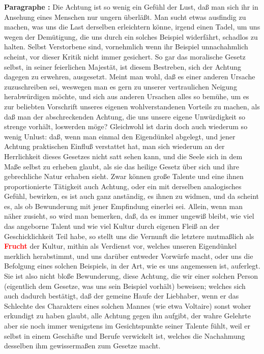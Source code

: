 \documentclass[a4paper,12pt,twoside]{book}
\newcommand{\match}[1]{\textcolor{red}{\textbf{#1}}}
\begin{document}
	\textbf{Paragraphe : }Die Achtung ist so wenig ein Gefühl der Lust, daß man sich ihr in Ansehung eines Menschen nur ungern überläßt. Man sucht etwas ausfindig zu machen, was uns die Last derselben erleichtern könne, irgend einen Tadel, um uns wegen der Demütigung, die uns durch ein solches Beispiel widerfährt, schadlos zu halten. Selbst Verstorbene sind, vornehmlich wenn ihr Beispiel unnachahmlich scheint, vor dieser Kritik nicht immer gesichert. So gar das moralische Gesetz selbst, in seiner feierlichen Majestät, ist diesem Bestreben, sich der Achtung dagegen zu erwehren, ausgesetzt. Meint man wohl, daß es einer anderen Ursache zuzuschreiben sei, weswegen man es gern zu unserer vertraulichen Neigung herabwürdigen möchte, und sich aus anderen Ursachen alles so bemühe, um es zur beliebten Vorschrift unseres eigenen wohlverstandenen Vorteils zu machen, als daß man der abschreckenden Achtung, die uns unsere eigene Unwürdigkeit so strenge vorhält, loswerden möge? Gleichwohl ist darin doch auch wiederum so wenig Unlust: daß, wenn man einmal den Eigendünkel abgelegt, und jener Achtung praktischen Einfluß verstattet hat, man sich wiederum an der Herrlichkeit dieses Gesetzes nicht satt  sehen kann, und die Seele sich in dem Maße selbst zu erheben glaubt, als sie das heilige Gesetz über sich und ihre gebrechliche Natur erhaben sieht. Zwar können große Talente und eine ihnen proportionierte Tätigkeit auch Achtung, oder ein mit derselben analogisches Gefühl, bewirken, es ist auch ganz anständig, es ihnen zu widmen, und da scheint es, als ob Bewunderung mit jener Empfindung einerlei sei. Allein, wenn man näher zusieht, so wird man bemerken, daß, da es immer ungewiß bleibt, wie viel das angeborne Talent und wie viel Kultur durch eigenen Fleiß an der Geschicklichkeit Teil habe, so stellt uns die Vernunft die letztere mutmaßlich als \match{Frucht} der Kultur, mithin als Verdienst vor, welches unseren Eigendünkel merklich herabstimmt, und uns darüber entweder Vorwürfe macht, oder uns die Befolgung eines solchen Beispiels, in der Art, wie es uns angemessen ist, auferlegt. Sie ist also nicht bloße Bewunderung, diese Achtung, die wir einer solchen Person (eigentlich dem Gesetze, was uns sein Beispiel vorhält) beweisen; welches sich auch dadurch bestätigt, daß der gemeine Haufe der Liebhaber, wenn er das Schlechte des Charakters eines solchen Mannes (wie etwa Voltaire) sonst woher erkundigt zu haben glaubt, alle Achtung gegen ihn aufgibt, der wahre Gelehrte aber sie noch immer wenigstens im Gesichtspunkte seiner Talente fühlt, weil er selbst in einem Geschäfte und Berufe verwickelt ist, welches die Nachahmung desselben ihm gewissermaßen zum Gesetze macht. 
	
\end{document}
